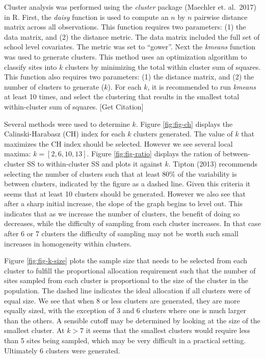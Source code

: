 \documentclass[man,floatsintext]{apa6}
\theoremstyle{definition}
\theoremstyle{definition}
\theoremstyle{definition}
\theoremstyle{remark}
\begin{document}
Cluster analysis was performed using the \emph{cluster} package
(Maechler et. al.~2017) in R. First, the \emph{daisy} function is used
to compute an \(n\) by \(n\) pairwise distance matrix across all
observations. This function requires two parameters: (1) the data
matrix, and (2) the distance metric. The data matrix included the full
set of school level covariates. The metric was set to \enquote{gower}.
Next the \emph{kmeans} function was used to generate clusters. This
method uses an optimization algorithm to classify sites into \(k\)
clusters by minimizing the total within cluster sum of squares. This
function also requires two parameters: (1) the distance matrix, and (2)
the number of clusters to generate (\(k\)). For each \(k\), it is
recommended to run \emph{kmeans} at least 10 times, and select the
clustering that results in the smallest total within-cluster sum of
squares. {[}Get Citation{]}

Several methods were used to determine \(k\). Figure \ref{fig:fig-ch}
displays the Calinski-Harabasz (CH) index for each \(k\) clusters
generated. The value of \(k\) that maximizes the CH index should be
selected. However we see several local maxima: \(k = [2, 6, 10, 13]\).
Figure \ref{fig:fig-ratio} displays the ration of between-cluster SS to
within-cluster SS and plots it against \(k\). Tipton (2013) recommends
selecting the number of clusters such that at least 80\% of the
variability is between clusters, indicated by the figure as a dashed
line. Given this criteria it seems that at least 10 clusters should be
generated. However we also see that after a sharp initial increase, the
slope of the graph begins to level out. This indicates that as we
increase the number of clusters, the benefit of doing so decreases,
while the difficulty of sampling from each cluster increases. In that
case after 6 or 7 clusters the difficulty of sampling may not be worth
such small increases in homogeneity within clusters.

Figure \ref{fig:fig-k-size} plots the sample size that needs to be
selected from each cluster to fulfill the proportional allocation
requirement such that the number of sites sampled from each cluster is
proportional to the size of the cluster in the population. The dashed
line indicates the ideal allocation if all clusters were of equal size.
We see that when 8 or less clusters are generated, they are more equally
sized, with the exception of 3 and 6 clusters where one is much larger
than the others. A sensible cutoff may be determined by looking at the
size of the smallest cluster. At \(k > 7\) it seems that the smallest
clusters would require less than 5 sites being sampled, which may be
very difficult in a practical setting. Ultimately 6 clusters were
generated.
\end{document}
